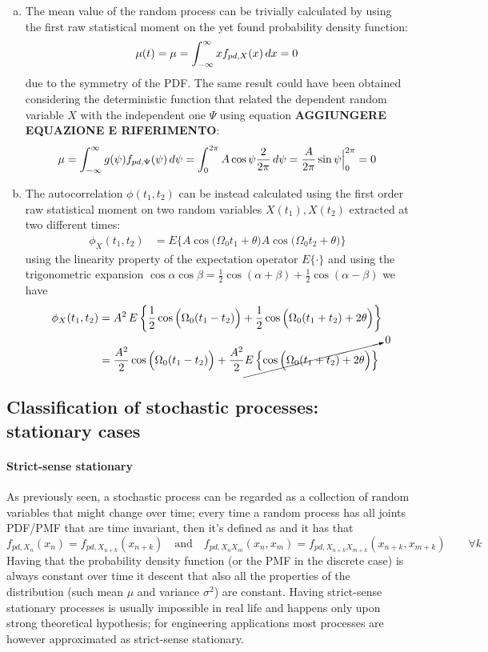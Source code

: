 \begin{enumerate}[a)]
		\item The mean value of the random process can be trivially calculated by using the first raw statistical moment on the yet found probability density function:
		\[ \mu(t) = \mu = \int_{-\infty}^\infty x f_{pd,X}(x)\, dx = 0 \]
		due to the symmetry of the PDF. The same result could have been obtained considering the deterministic function that related the dependent random variable $X$ with the independent one $\Psi$ using equation \textbf{AGGIUNGERE EQUAZIONE E RIFERIMENTO}:
		\[ \mu = \int_{-\infty}^\infty g(\psi) f_{pd,\Psi}(\psi) \, d\psi = \int_0^{2\pi} A \cos\psi \frac{2 }{2\pi} \, d\psi = \frac A {2\pi} \sin \psi \Big|_{0}^{2\pi} = 0 \]
		
		\item The autocorrelation $\phi(t_1,t_2)$ can be instead calculated using the first order raw statistical moment on two random variables $X(t_1),X(t_2)$ extracted at two different times:
		\begin{align*}
			\phi_X(t_1,t_2) & = E\big\{ A \cos \big(\Omega_0 t_1 + \theta \big) A \cos \big(\Omega_0 t_2 + \theta \big) \big\}
		\end{align*}
		using the linearity property of the expectation operator $E\{\cdot\}$ and using the trigonometric expansion $\cos \alpha \cos \beta = \frac 1 2 \cos(\alpha + \beta) + \frac 1 2 \cos(\alpha - \beta)$ we have		
		\begin{align*}
			\phi_X(t_1,t_2) & = A^2 \, E\left\{ \frac 1 2 \cos \Big( \Omega_0(t_1-t_2) \Big) + \frac 1 2 \cos \Big( \Omega_0 (t_1+t_2) + 2\theta \Big) \right\} \\
			& = \frac {A^2}2 \cos\Big(\Omega_0 (t_1-t_2)\Big) + \frac {A^2}2 \cancelto{0}{E \left\{\cos \Big( \Omega_0 (t_1+t_2) + 2\theta \Big) \right\} }
		\end{align*}
	\end{enumerate}
	
	\subsection{Classification of stochastic processes: stationary cases}
		\paragraph{Strict-sense stationary} As previously seen, a stochastic process can be regarded as a collection of random variables that might change over time; every time a random process has all joints PDF/PMF that are time invariant, then it's defined as  and it has that
		\[ f_{pd, X_n} (x_n) = f_{pd,X_{n+k}} (x_{n+k}) \quad \textrm{and} \quad f_{pd, X_n X_m} (x_n, x_m) = f_{pd,X_{n+k}X_{m+k}} (x_{n+k}, x_{m+k}) \qquad \forall k \]
		Having that the probability density function (or the PMF in the discrete case) is always constant over time it descent that also all the properties of the distribution (such mean $\mu$ and variance $\sigma^2$) are constant. Having strict-sense stationary processes is usually impossible in real life and happens only upon strong theoretical hypothesis; for engineering applications most processes are however approximated as strict-sense stationary.
		
